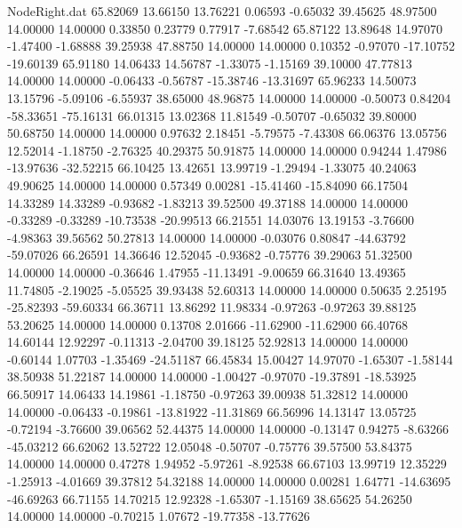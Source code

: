 \begin{filecontents}{NodeRight.dat}
  65.82069   13.66150   13.76221     0.06593   -0.65032   39.45625   48.97500   14.00000   14.00000    0.33850    0.23779    0.77917   -7.68542
  65.87122   13.89648   14.97070    -1.47400   -1.68888   39.25938   47.88750   14.00000   14.00000    0.10352   -0.97070  -17.10752  -19.60139
  65.91180   14.06433   14.56787    -1.33075   -1.15169   39.10000   47.77813   14.00000   14.00000   -0.06433   -0.56787  -15.38746  -13.31697
  65.96233   14.50073   13.15796    -5.09106   -6.55937   38.65000   48.96875   14.00000   14.00000   -0.50073    0.84204  -58.33651  -75.16131
  66.01315   13.02368   11.81549    -0.50707   -0.65032   39.80000   50.68750   14.00000   14.00000    0.97632    2.18451   -5.79575   -7.43308
  66.06376   13.05756   12.52014    -1.18750   -2.76325   40.29375   50.91875   14.00000   14.00000    0.94244    1.47986  -13.97636  -32.52215
  66.10425   13.42651   13.99719    -1.29494   -1.33075   40.24063   49.90625   14.00000   14.00000    0.57349    0.00281  -15.41460  -15.84090
  66.17504   14.33289   14.33289    -0.93682   -1.83213   39.52500   49.37188   14.00000   14.00000   -0.33289   -0.33289  -10.73538  -20.99513
  66.21551   14.03076   13.19153    -3.76600   -4.98363   39.56562   50.27813   14.00000   14.00000   -0.03076    0.80847  -44.63792  -59.07026
  66.26591   14.36646   12.52045    -0.93682   -0.75776   39.29063   51.32500   14.00000   14.00000   -0.36646    1.47955  -11.13491   -9.00659
  66.31640   13.49365   11.74805    -2.19025   -5.05525   39.93438   52.60313   14.00000   14.00000    0.50635    2.25195  -25.82393  -59.60334
  66.36711   13.86292   11.98334    -0.97263   -0.97263   39.88125   53.20625   14.00000   14.00000    0.13708    2.01666  -11.62900  -11.62900
  66.40768   14.60144   12.92297    -0.11313   -2.04700   39.18125   52.92813   14.00000   14.00000   -0.60144    1.07703   -1.35469  -24.51187
  66.45834   15.00427   14.97070    -1.65307   -1.58144   38.50938   51.22187   14.00000   14.00000   -1.00427   -0.97070  -19.37891  -18.53925
  66.50917   14.06433   14.19861    -1.18750   -0.97263   39.00938   51.32812   14.00000   14.00000   -0.06433   -0.19861  -13.81922  -11.31869
  66.56996   14.13147   13.05725    -0.72194   -3.76600   39.06562   52.44375   14.00000   14.00000   -0.13147    0.94275   -8.63266  -45.03212
  66.62062   13.52722   12.05048    -0.50707   -0.75776   39.57500   53.84375   14.00000   14.00000    0.47278    1.94952   -5.97261   -8.92538
  66.67103   13.99719   12.35229    -1.25913   -4.01669   39.37812   54.32188   14.00000   14.00000    0.00281    1.64771  -14.63695  -46.69263
  66.71155   14.70215   12.92328    -1.65307   -1.15169   38.65625   54.26250   14.00000   14.00000   -0.70215    1.07672  -19.77358  -13.77626

\end{filecontents}
